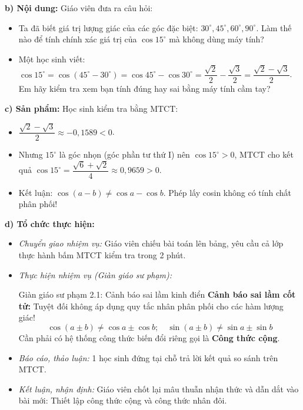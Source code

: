 \documentclass[12pt, a4paper]{article}
\begin{document}
\textbf{b) Nội dung:} Giáo viên đưa ra câu hỏi:
\begin{itemize}[leftmargin=0.6cm]
    \item Ta đã biết giá trị lượng giác của các góc đặc biệt: $30^\circ, 45^\circ, 60^\circ, 90^\circ$. Làm thế nào để tính chính xác giá trị của $\cos 15^\circ$ mà không dùng máy tính?
    \item Một học sinh viết: $\cos 15^\circ = \cos(45^\circ - 30^\circ) = \cos 45^\circ - \cos 30^\circ = \dfrac{\sqrt{2}}{2} - \dfrac{\sqrt{3}}{2} = \dfrac{\sqrt{2} - \sqrt{3}}{2}$. Em hãy kiểm tra xem bạn tính đúng hay sai bằng máy tính cầm tay?
\end{itemize}

\textbf{c) Sản phẩm:} Học sinh kiểm tra bằng MTCT:
\begin{itemize}[leftmargin=0.6cm]
    \item $\dfrac{\sqrt{2} - \sqrt{3}}{2} \approx -0{,}1589 < 0$.
    \item Nhưng $15^\circ$ là góc nhọn (góc phần tư thứ I) nên $\cos 15^\circ > 0$, MTCT cho kết quả $\cos 15^\circ = \dfrac{\sqrt{6} + \sqrt{2}}{4} \approx 0{,}9659 > 0$.
    \item Kết luận: $\cos(a - b) \neq \cos a - \cos b$. Phép lấy cosin không có tính chất phân phối!
\end{itemize}

\textbf{d) Tổ chức thực hiện:}
\begin{itemize}[leftmargin=0.6cm]
    \item \textit{Chuyển giao nhiệm vụ:} Giáo viên chiếu bài toán lên bảng, yêu cầu cả lớp thực hành bấm MTCT kiểm tra trong 2 phút.
    \item \textit{Thực hiện nhiệm vụ (Giàn giáo sư phạm):}
    \begin{scaffoldbox}{Giàn giáo sư phạm 2.1: Cảnh báo sai lầm kinh điển}
        \textbf{Cảnh báo sai lầm cốt tử:}
        Tuyệt đối không áp dụng quy tắc nhân phân phối cho các hàm lượng giác!
        $$\cos(a \pm b) \neq \cos a \pm \cos b; \quad \sin(a \pm b) \neq \sin a \pm \sin b$$
        Cần phải có hệ thống công thức biến đổi riêng gọi là \textbf{Công thức cộng}.
    \end{scaffoldbox}
    \item \textit{Báo cáo, thảo luận:} 1 học sinh đứng tại chỗ trả lời kết quả so sánh trên MTCT.
    \item \textit{Kết luận, nhận định:} Giáo viên chốt lại mâu thuẫn nhận thức và dẫn dắt vào bài mới: Thiết lập công thức cộng và công thức nhân đôi.
\end{itemize}
\end{document}
